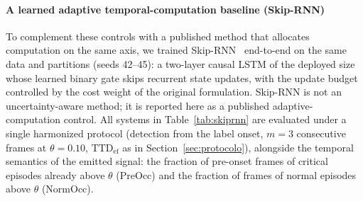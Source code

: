 \documentclass[a4paper,fleqn]{cas-dc}
\begin{document}
{\paragraph{A learned adaptive temporal-computation baseline (Skip-RNN)}
To complement these controls with a published method that allocates
computation on the same axis, we trained Skip-RNN~\cite{campos2018skip}
end-to-end on the same data and partitions (seeds 42--45): a two-layer causal
LSTM of the deployed size whose learned binary gate skips recurrent state
updates, with the update budget controlled by the cost weight of the original
formulation. Skip-RNN is not an uncertainty-aware method; it is reported here
as a published adaptive-computation control. All systems in
Table~\ref{tab:skiprnn} are evaluated under a single harmonized protocol
(detection from the label onset, $m{=}3$ consecutive frames at
$\theta=0.10$, $\mathrm{TTD}_{\mathrm{ef}}$ as in
Section~\ref{sec:protocolo}), alongside the temporal semantics of the emitted
signal: the fraction of pre-onset frames of critical episodes already above
$\theta$ (PreOcc) and the fraction of frames of normal episodes above
$\theta$ (NormOcc).

}
\end{document}
